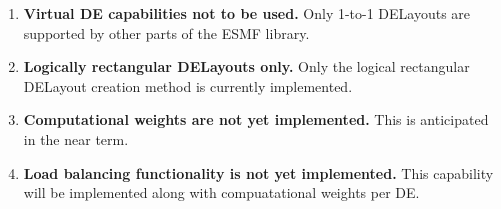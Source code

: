 

\begin{enumerate}

\item {\bf Virtual DE capabilities not to be used.}
Only 1-to-1 DELayouts are supported by other parts of the ESMF library.

\item {\bf Logically rectangular DELayouts only.}
Only the logical rectangular DELayout creation method is currently implemented.

\item {\bf Computational weights are not yet implemented.}
This is anticipated in the near term.

\item {\bf Load balancing functionality is not yet implemented.}
This capability will be implemented along with compuatational weights per DE.

\end{enumerate}


